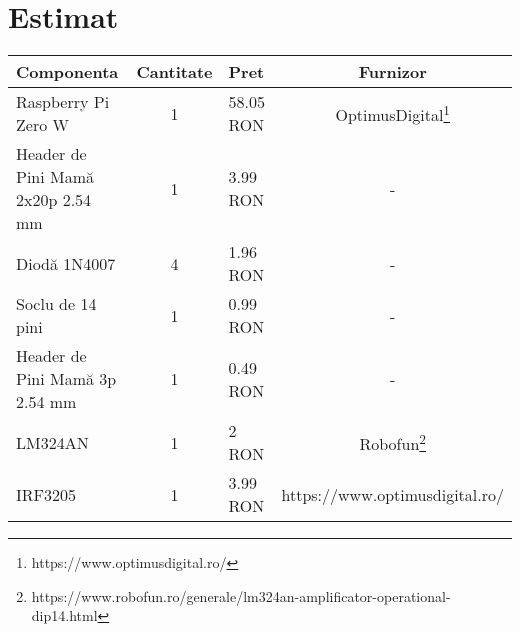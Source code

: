 \section {Estimat}
\begin{minipage}{\textwidth}
  \centering
  \begin{tabular}{ lclc } 
    \midrule
    Componenta & Cantitate & Pret & Furnizor \\
    \midrule
    \midrule
    Raspberry Pi Zero W & 1 & 58.05 RON & OptimusDigital\footnote{https://www.optimusdigital.ro/} \\

    Header de Pini Mamă 2x20p 2.54 mm & 1 & 3.99 RON & -\\ 

    Diodă 1N4007 & 4 & 1.96 RON & -\\ 

    Soclu de 14 pini & 1 & 0.99 RON & -\\ 

    Header de Pini Mamă 3p 2.54 mm & 1 & 0.49 RON & -\\ 

    LM324AN & 1 & 2 RON & Robofun\footnote{https://www.robofun.ro/generale/lm324an-amplificator-operational-dip14.html}\\ 

    IRF3205 & 1 & 3.99 RON & https://www.optimusdigital.ro/\\ 
    \midrule
  \end{tabular}
\end{minipage}
